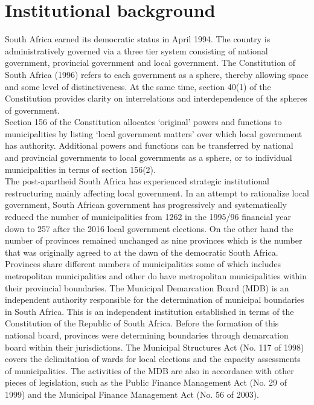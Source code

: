 \documentclass[dvipdfmx]{jsarticle}
\begin{document}
\section{Institutional background}
\quad South Africa earned its democratic status in April 1994. The country is administratively governed via a three tier system consisting of national government, provincial government and local government. The Constitution of South Africa (1996) refers to each government as a sphere, thereby allowing space and some level of distinctiveness. At the same time, section 40(1) of the Constitution provides clarity on interrelations and interdependence of the spheres of government. \\
\quad Section 156 of the Constitution allocates ‘original’ powers and functions to municipalities by listing ‘local government matters’ over which local government has authority. Additional powers and functions can be transferred by national and provincial governments to local governments as a sphere, or to individual municipalities in terms of section 156(2).\\ 
\quad The post-apartheid South Africa has experienced strategic institutional restructuring mainly affecting local government. In an attempt to rationalize local government, South African government has progressively and systematically reduced the number of municipalities from 1262 in the 1995/96 financial year down to 257 after the 2016 local government elections.  On the other hand the number of provinces remained unchanged as nine provinces which is the number that was originally agreed to at the dawn of the democratic South Africa. Provinces share different numbers of municipalities some of which includes metropolitan municipalities and other do have metropolitan municipalities within their provincial boundaries. The Municipal Demarcation Board (MDB) is an independent authority responsible for the determination of municipal boundaries in South Africa. This is an independent institution established in terms of the Constitution of the Republic of South Africa. Before the formation of this national board, provinces were determining boundaries through demarcation board within their jurisdictions. The Municipal Structures Act (No. 117 of 1998) covers the delimitation of wards for local elections and the capacity assessments of municipalities. The activities of the MDB are also in accordance with other pieces of legislation, such as the Public Finance Management Act (No. 29 of 1999) and the Municipal Finance Management Act (No. 56 of 2003).\\
\end{document}
